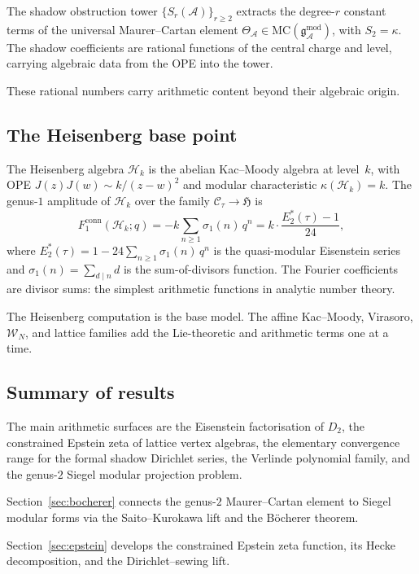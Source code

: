 \documentclass[11pt,reqno]{amsart}
\theoremstyle{definition}
\theoremstyle{remark}
\providecommand{\cA}{\mathcal{A}}
\providecommand{\cC}{\mathcal{C}}
\providecommand{\cH}{\mathcal{H}}
\providecommand{\cW}{\mathcal{W}}
\providecommand{\MC}{\mathrm{MC}}
\providecommand{\conn}{\mathrm{conn}}
\providecommand{\gmod}{\mathfrak{g}^{\mathrm{mod}}_\cA}
\numberwithin{equation}{section}
\begin{document}
The shadow obstruction tower $\{S_r(\cA)\}_{r \ge 2}$ extracts the
degree-$r$ constant terms of the universal Maurer--Cartan element
$\Theta_\cA \in \MC(\gmod)$, with $S_2 = \kappa$. The shadow
coefficients are rational functions of the central charge and level,
carrying algebraic data from the OPE into the tower.

These rational numbers carry arithmetic content beyond their
algebraic origin.

\subsection{The Heisenberg base point}

The Heisenberg algebra $\cH_k$ is the abelian Kac--Moody algebra at
level~$k$, with OPE $J(z)J(w) \sim k/(z-w)^2$ and modular
characteristic $\kappa(\cH_k) = k$.
The genus-$1$ amplitude of $\cH_k$ over the family
$\cC_\tau \to \mathfrak{H}$ is
\begin{equation}\label{eq:heis-genus1}
  F_1^{\conn}(\cH_k; q)
  = -k \sum_{n \ge 1} \sigma_1(n)\, q^n
  = k \cdot \frac{E_2^*(\tau) - 1}{24},
\end{equation}
where $E_2^*(\tau) = 1 - 24\sum_{n \ge 1} \sigma_1(n)\,q^n$ is the
quasi-modular Eisenstein series and $\sigma_1(n) = \sum_{d \mid n} d$
is the sum-of-divisors function. The Fourier coefficients are
divisor sums: the simplest arithmetic functions in analytic number
theory.

The Heisenberg computation is the base model. The affine
Kac--Moody, Virasoro, $\cW_N$, and lattice families add the
Lie-theoretic and arithmetic terms one at a time.

\subsection{Summary of results}

The main arithmetic surfaces are the Eisenstein factorisation of
$D_2$, the constrained Epstein zeta of lattice vertex algebras, the
elementary convergence range for the formal shadow Dirichlet series,
the Verlinde polynomial family, and the genus-$2$ Siegel modular
projection problem.

Section~\ref{sec:bocherer} connects the genus-$2$ Maurer--Cartan
element to Siegel modular forms via the Saito--Kurokawa lift and the
B\"ocherer theorem.

Section~\ref{sec:epstein} develops the constrained Epstein zeta
function, its Hecke decomposition, and the Dirichlet--sewing lift.
\end{document}
